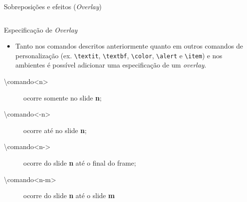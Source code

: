 \begin{frame}[fragile]{Sobreposições e efeitos (\textit{Overlay})}
\begin{columns}


    \end{columns}
\end{frame}

\begin{frame}[fragile]{Especificação de \textit{Overlay}}
    \begin{itemize}
    \item Tanto nos comandos descritos anteriormente quanto em outros comandos de personalização (ex. \verb|\textit|, \verb|\textbf|, \verb|\color|, \verb|\alert| e \verb|\item|) e nos ambientes é possível adicionar uma especificação de um \textit{overlay}.
    \end{itemize}

    \begin{description}
    \item[\textbackslash comando<n>]  ocorre somente no slide \textbf{n};
    \item[\textbackslash comando<-n>]  ocorre até no slide \textbf{n};
    \item[\textbackslash comando<n->]  ocorre do slide \textbf{n} até o final do frame;\
    \item[\textbackslash comando<n-m>]  ocorre do slide \textbf{n} até o slide \textbf{m} 
    \end{description}
\end{frame}

